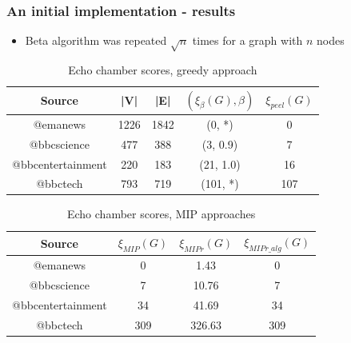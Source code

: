 \documentclass{beamer}
\begin{document}
\begin{frame}[c]
	\frametitle{An initial implementation - results}
	\begin{itemize}
		\item Beta algorithm was repeated $ \sqrt{n}$ times for a graph with $n$ nodes
	\end{itemize}

	\begin{table}[htpb]
		\centering
		\caption{Echo chamber scores, greedy approach}
		\begin{tabular}{c|c|c|c|c}
			\textbf{Source}     & {|V|}                   & {|E|}
			                    & $(\xi_\beta(G), \beta)$ &
			$\xi_{peel} (G)$                                                       \\
			\hline
			{@emanews}          & {1226}                  & {1842} & (0, *)    & 0 \\
			{@bbcscience}       & {477}                   & {388}  & (3, 0.9)  & 7 \\
			{@bbcentertainment} & {220}                   & {183}  & (21, 1.0)
			                    & 16                                               \\
			{@bbctech}          & {793}                   & {719}  & (101, *)
			                    & 107                                              \\
		\end{tabular}
	\end{table}
	\begin{table}[htpb]
		\centering
		\caption{Echo chamber scores, MIP approaches}
		\begin{tabular}{c|c|c|c}
			\textbf{Source}     & $\xi_{MIP}(G) $ & $\xi_{MIPr}(G)$ &
			$\xi_{MIPr\_alg}(G)$                                          \\
			\hline
			{@emanews}          & 0               & 1.43            & 0   \\
			{@bbcscience}       & 7               & 10.76           & 7   \\
			{@bbcentertainment} & 34              & 41.69           & 34  \\
			{@bbctech}          & 309             & 326.63          & 309 \\
		\end{tabular}
	\end{table}
\end{frame}
\end{document}

